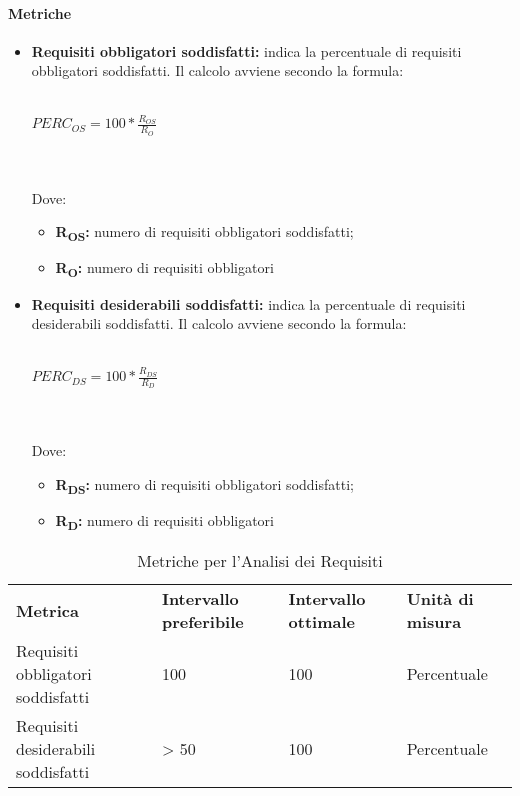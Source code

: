 \paragraph{Metriche}
\begin{itemize}
	\item \textbf{Requisiti obbligatori soddisfatti:} indica la percentuale di requisiti obbligatori soddisfatti. Il calcolo avviene secondo la formula:\\\\
	\centerline{
		\begin{math}
		PERC_{OS}=100*\frac{R_{OS}}{R_O}
		\end{math}
	}
	\\\\Dove:
	\begin{itemize}
		\item \textbf{R\textsubscript{OS}:} numero di requisiti obbligatori soddisfatti;
		\item \textbf{R\textsubscript{O}:} numero di requisiti obbligatori
	\end{itemize}
	\item \textbf{Requisiti desiderabili soddisfatti:} indica la percentuale di requisiti desiderabili soddisfatti. Il calcolo avviene secondo la formula:\\\\
		\centerline{
		\begin{math}
		PERC_{DS}=100*\frac{R_{DS}}{R_D}
		\end{math}
	}
	\\\\Dove:
	\begin{itemize}
		\item \textbf{R\textsubscript{DS}:} numero di requisiti obbligatori soddisfatti;
		\item \textbf{R\textsubscript{D}:} numero di requisiti obbligatori
	\end{itemize}	
\end{itemize}

\renewcommand{\arraystretch}{2.2}
\begin{longtable}{|C{4.5cm}|C{2.25cm}|C{2.25cm}|C{3cm}|}
	
	\caption{Metriche per l'Analisi dei Requisiti }\\
	\hline
	
	\textbf{Metrica} & \textbf{Intervallo preferibile}  & \textbf{Intervallo ottimale} & \textbf{Unità di misura}
	\tabularnewline
	\endfirsthead
	
	Requisiti obbligatori soddisfatti &  100 & 100 & Percentuale \\ 
	Requisiti desiderabili soddisfatti &  > 50 & 100 & Percentuale \\ 
\end{longtable}



